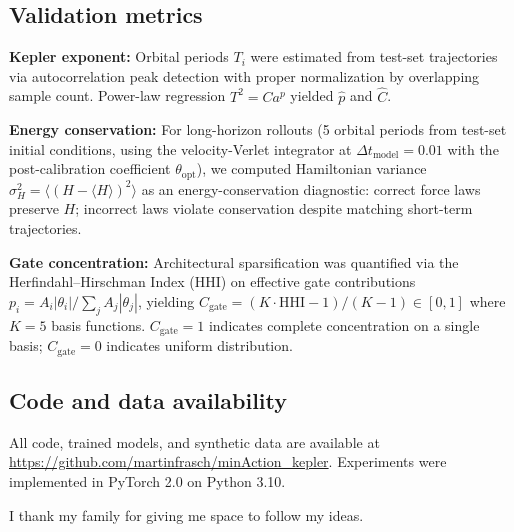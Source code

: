 \documentclass[aps,pre,reprint,superscriptaddress,longbibliography]{revtex4-2}
\begin{document}
\subsection{Validation metrics}
\textbf{Kepler exponent:} Orbital periods $T_i$ were estimated from test-set trajectories via autocorrelation peak detection with proper normalization by overlapping sample count. Power-law regression $T^2 = C a^p$ yielded $\hat{p}$ and $\hat{C}$.

\textbf{Energy conservation:} For long-horizon rollouts (5 orbital periods from test-set initial conditions, using the velocity-Verlet integrator at $\Delta t_{\text{model}} = 0.01$ with the post-calibration coefficient $\theta_{\text{opt}}$), we computed Hamiltonian variance $\sigma_H^2 = \langle (H - \langle H \rangle)^2 \rangle$ as an energy-conservation diagnostic: correct force laws preserve $H$; incorrect laws violate conservation despite matching short-term trajectories.

\textbf{Gate concentration:} Architectural sparsification was quantified via the Herfindahl--Hirschman Index (HHI) on effective gate contributions $p_i = A_i|\theta_i| / \sum_j A_j|\theta_j|$, yielding $C_{\mathrm{gate}} = (K \cdot \text{HHI} - 1)/(K-1) \in [0,1]$ where $K=5$ basis functions. $C_{\mathrm{gate}}=1$ indicates complete concentration on a single basis; $C_{\mathrm{gate}}=0$ indicates uniform distribution.

\subsection{Code and data availability}
All code, trained models, and synthetic data are available at \url{https://github.com/martinfrasch/minAction_kepler}. Experiments were implemented in PyTorch 2.0 on Python 3.10.

\begin{acknowledgments}
I thank my family for giving me space to follow my ideas.
\end{acknowledgments}


\end{document}
